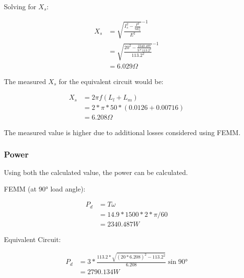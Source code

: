 \documentclass[12pt]{article}
\begin{document}
Solving for $X_{s}$:

\begin{center}
    \begin{align*}
        X_{s} &= \sqrt{\frac{I_{s}^{2} - \frac{P^{2}}{9 E_{b}^{2}}}{E^{2}}}^{-1}\\
            &= \sqrt{\frac{20^{2} - \frac{2340.487}{9 * 113.2^{2}}}{113.2^{2}}}^{-1}\\
            &= 6.029 \Omega
    \end{align*}
\end{center}

The measured $X_{s}$ for the equivalent circuit would be:

\begin{center}
    \begin{align*}
        X_{s} &= 2\pi{}f(L_{l} + L_{m})\\
            &= 2 * \pi * 50 * (0.0126 + 0.00716)\\
            &= 6.208 \Omega
    \end{align*}
\end{center}

The measured value is higher due to additional losses considered using FEMM.

\subsubsection{Power}

Using both the calculated value, the power can be calculated.

FEMM (at \ang{90} load angle):

\begin{center}
    \begin{align*}
        P_{d} &= T \omega\\
           &= 14.9 * 1500 * 2 * \pi / 60\\
            &= 2340.487 W
    \end{align*}
\end{center}

Equivalent Circuit:

\begin{center}
    \begin{align*}
        P_{d} &= 3 * \frac{113.2 * \sqrt{(20 * 6.208)^{2} - 113.2^{2}}}{6.208} \sin{\ang{90}}\\
            &= 2790.134 W
    \end{align*}
\end{center}
\end{document}
